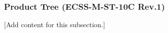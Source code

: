
\subsubsection{Product Tree (ECSS-M-ST-10C Rev.1)}
\label{subsubsec:design_2_1_product_tree}

[Add content for this subsection.]
